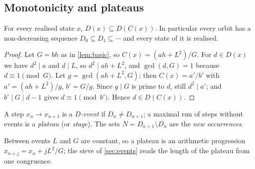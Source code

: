 \subsection{Monotonicity and plateaus}
\begin{lemma}\label{lem:M}
For every realised state $x$, $D(x)\subseteq D(C(x))$. In particular every orbit has a non-decreasing sequence $D_0\subseteq D_1\subseteq\cdots$ and every state of it is realised.
\end{lemma}
\begin{proof}
Let $G=bh$ as in \cref{lem:basic}, so $C(x)=(ah+L^2)/G$. For $d\in D(x)$ we have $d^2\mid a$ and $d\mid L$, so $d^2\mid ah+L^2$, and $\gcd(d,G)=1$ because $d\equiv1\pmod G$. Let $g=\gcd(ah+L^2,G)$; then $C(x)=a'/b'$ with $a'=(ah+L^2)/g$, $b'=G/g$. Since $g\mid G$ is prime to $d$, still $d^2\mid a'$; and $b'\mid G\mid d-1$ gives $d\equiv1\pmod{b'}$. Hence $d\in D(C(x))$. \qedhere
\end{proof}

\begin{definition}\label{def:event}
A step $x_n\to x_{n+1}$ is a \emph{$D$-event} if $D_n\ne D_{n+1}$; a maximal run of steps without events is a \emph{plateau} (or \emph{stage}). The sets $N=D_{n+1}\setminus D_n$ are the \emph{new occurrences}.
\end{definition}
Between events $L$ and $G$ are constant, so a plateau is an arithmetic progression $x_{n+j}=x_n+jL^2/G$; the sieve of \cref{sec:events} reads the length of the plateau from one congruence.
